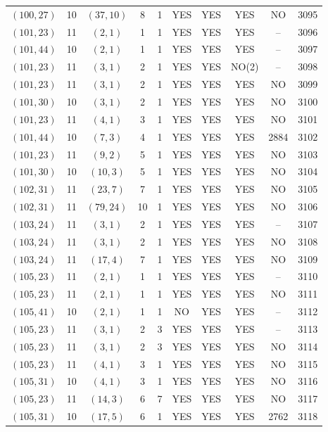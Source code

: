 \begin{longtable}{|c|c|c|c|c|c|c|c|c|c|}
$(100, 27)$ & 10 & $(37, 10)$ & 8 & 1 & YES & YES & YES & NO & 3095\\
$(101, 23)$ & 11 & $(2, 1)$ & 1 & 1 & YES & YES & YES & -- & 3096\\
$(101, 44)$ & 10 & $(2, 1)$ & 1 & 1 & YES & YES & YES & -- & 3097\\
$(101, 23)$ & 11 & $(3, 1)$ & 2 & 1 & YES & YES & NO(2) & -- & 3098\\
$(101, 23)$ & 11 & $(3, 1)$ & 2 & 1 & YES & YES & YES & NO & 3099\\
$(101, 30)$ & 10 & $(3, 1)$ & 2 & 1 & YES & YES & YES & NO & 3100\\
$(101, 23)$ & 11 & $(4, 1)$ & 3 & 1 & YES & YES & YES & NO & 3101\\
$(101, 44)$ & 10 & $(7, 3)$ & 4 & 1 & YES & YES & YES & 2884 & 3102\\
$(101, 23)$ & 11 & $(9, 2)$ & 5 & 1 & YES & YES & YES & NO & 3103\\
$(101, 30)$ & 10 & $(10, 3)$ & 5 & 1 & YES & YES & YES & NO & 3104\\
$(102, 31)$ & 11 & $(23, 7)$ & 7 & 1 & YES & YES & YES & NO & 3105\\
$(102, 31)$ & 11 & $(79, 24)$ & 10 & 1 & YES & YES & YES & NO & 3106\\
$(103, 24)$ & 11 & $(3, 1)$ & 2 & 1 & YES & YES & YES & -- & 3107\\
$(103, 24)$ & 11 & $(3, 1)$ & 2 & 1 & YES & YES & YES & NO & 3108\\
$(103, 24)$ & 11 & $(17, 4)$ & 7 & 1 & YES & YES & YES & NO & 3109\\
$(105, 23)$ & 11 & $(2, 1)$ & 1 & 1 & YES & YES & YES & -- & 3110\\
$(105, 23)$ & 11 & $(2, 1)$ & 1 & 1 & YES & YES & YES & NO & 3111\\
$(105, 41)$ & 10 & $(2, 1)$ & 1 & 1 & NO & YES & YES & -- & 3112\\
$(105, 23)$ & 11 & $(3, 1)$ & 2 & 3 & YES & YES & YES & -- & 3113\\
$(105, 23)$ & 11 & $(3, 1)$ & 2 & 3 & YES & YES & YES & NO & 3114\\
$(105, 23)$ & 11 & $(4, 1)$ & 3 & 1 & YES & YES & YES & NO & 3115\\
$(105, 31)$ & 10 & $(4, 1)$ & 3 & 1 & YES & YES & YES & NO & 3116\\
$(105, 23)$ & 11 & $(14, 3)$ & 6 & 7 & YES & YES & YES & NO & 3117\\
$(105, 31)$ & 10 & $(17, 5)$ & 6 & 1 & YES & YES & YES & 2762 & 3118\\

\end{longtable}
